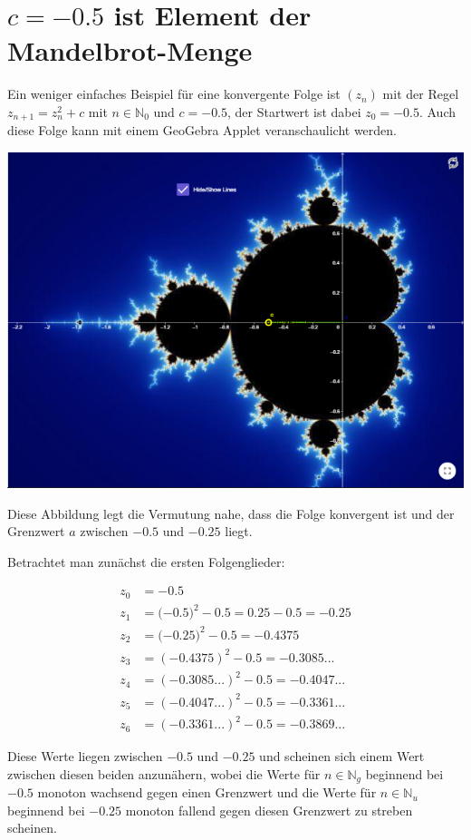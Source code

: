 \documentclass[a4paper, 12pt]{book}
\begin{document}
\section{$c=-0.5$ ist Element der Mandelbrot-Menge}

Ein weniger einfaches Beispiel für eine konvergente Folge ist
\(\left( z_{n} \right)\) mit der Regel \(z_{n + 1} = z_{n}^{2} + c\) mit
\(n \in \mathbb{N}_{0}\) und \(c =  -0.5\), der Startwert ist dabei
\(z_{0} =  -0.5\). Auch diese Folge kann mit einem GeoGebra Applet
veranschaulicht werden.

\begin{center}
\includegraphics[width=0.5\linewidth]{image12.png}
\end{center}


Diese Abbildung legt die Vermutung nahe, dass die Folge konvergent ist
und der Grenzwert \(a\) zwischen \(-0.5\) und \(-0.25\) liegt.


Betrachtet man zunächst die ersten Folgenglieder:

\begin{align*}
z_{0} &=  - 0.5\\
z_{1} &= ( - {0.5)}^{2} - 0.5 = 0.25 - 0.5 =  -0.25\\
z_{2} &= ( - {0.25)}^{2} - 0.5 =  -0.4375\\
z_{3} &= {( - 0.4375)}^{2} - 0.5 =  -0.3085...\\
z_{4} &= {( - 0.3085...)}^{2} - 0.5 =  -0.4047...\\
z_{5} &= {( - 0.4047...)}^{2} - 0.5 =  -0.3361...\\
z_{6} &= {( - 0.3361...)}^{2} - 0.5 =  -0.3869...
\end{align*}

Diese Werte liegen zwischen \(-0.5\) und \(-0.25\) und scheinen sich
einem Wert zwischen diesen beiden anzunähern, wobei die Werte für
\(n \in \mathbb{N}_{g}\) beginnend bei \(-0.5\) monoton wachsend
gegen einen Grenzwert und die Werte für \(n \in \mathbb{N}_{u}\)
beginnend bei \(-0.25\) monoton fallend gegen diesen Grenzwert zu
streben scheinen.
\end{document}
